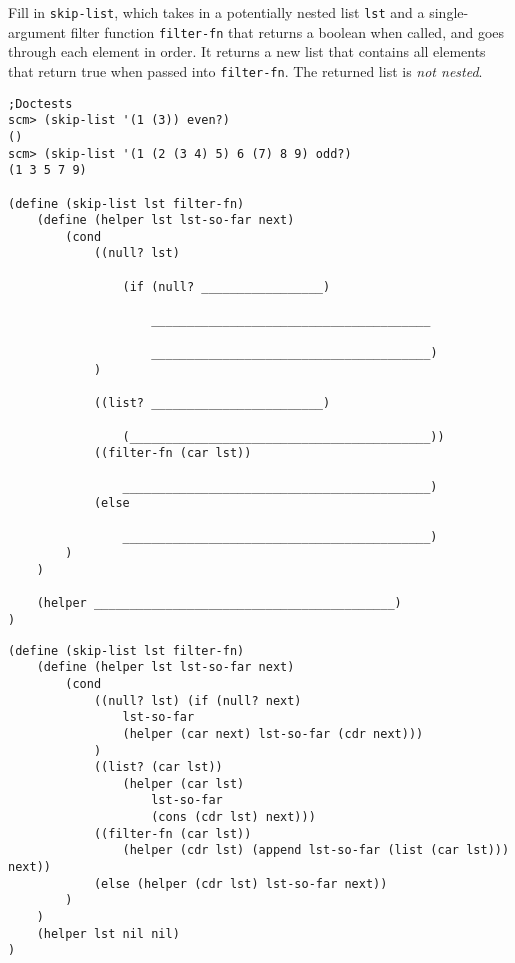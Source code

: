 \question Fill in \lstinline{skip-list}, which takes in a potentially nested list \lstinline{lst} and a single-argument filter function \lstinline{filter-fn} that returns a boolean when called, and goes through each element in order. It returns a new list that contains all elements that return true when passed into \lstinline{filter-fn}. The returned list is \textit{not nested}.

\begin{lstlisting}
;Doctests
scm> (skip-list '(1 (3)) even?)
()
scm> (skip-list '(1 (2 (3 4) 5) 6 (7) 8 9) odd?)
(1 3 5 7 9)

(define (skip-list lst filter-fn)
    (define (helper lst lst-so-far next)
        (cond
            ((null? lst)

                (if (null? _________________)

                    _______________________________________

                    _______________________________________)
            )

            ((list? ________________________)

                (__________________________________________))
            ((filter-fn (car lst))

                ___________________________________________)
            (else

                ___________________________________________)
        )
    )

    (helper __________________________________________)
)
\end{lstlisting}

\begin{solution}
\begin{lstlisting}
(define (skip-list lst filter-fn)
    (define (helper lst lst-so-far next)
        (cond
            ((null? lst) (if (null? next)
                lst-so-far
                (helper (car next) lst-so-far (cdr next)))
            )
            ((list? (car lst))
                (helper (car lst)
                    lst-so-far
                    (cons (cdr lst) next)))
            ((filter-fn (car lst))
                (helper (cdr lst) (append lst-so-far (list (car lst))) next))
            (else (helper (cdr lst) lst-so-far next))
        )
    )
    (helper lst nil nil)
)

\end{lstlisting}
\end{solution}


